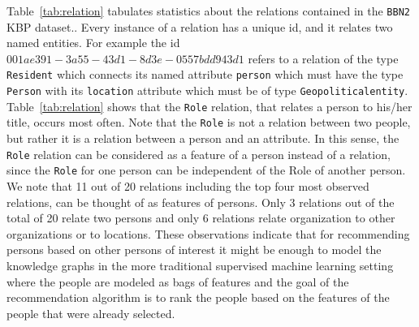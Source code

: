 \documentclass[paper=a4,fontsize=11pt]{scrartcl}
\newcommand{\Tabref}[1]{Table~\ref{#1}}
\numberwithin{equation}{section}    %
\numberwithin{figure}{section}      %
\numberwithin{table}{section}       %
\renewcommand{\cite}[1]{\textcolor{red}{#1}}
\newcommand{\dataset}[0]{\texttt{BBN2} KBP dataset.}
\begin{document}
\Tabref{tab:relation} tabulates statistics about the relations contained in the \dataset.
Every instance of a relation has a unique id, and it relates two named entities.
For example the id $001ae391-3a55-43d1-8d3e-0557bdd943d1$ refers to a relation of the
type \texttt{Resident} which connects its named attribute \texttt{person}
which must have the type \texttt{Person}
with its \texttt{location} attribute which must be of type
\texttt{Geopoliticalentity}.
\Tabref{tab:relation} shows that the \texttt{Role} relation,
that relates a person to his/her title, occurs most often.
Note that the \texttt{Role} is not a relation between two people, but rather
it is a relation between a person and an attribute.
In this sense, the \texttt{Role} relation can be considered as a feature of a person
instead of a relation, since the \texttt{Role} for one person can be
independent of the Role of another person.
We note that 11 out of 20 relations including the top four most observed relations,
can be thought of as features of persons.
Only 3 relations out of the total of 20 relate two persons and
only 6 relations relate organization to other organizations or to locations.
These observations indicate that for recommending persons based on other persons of interest
it might be enough to model the knowledge graphs in the more traditional supervised machine
learning setting where the people are modeled as bags of features and the goal of the
recommendation algorithm is to rank the people based on the features of the people
that were already selected.
\end{document}
